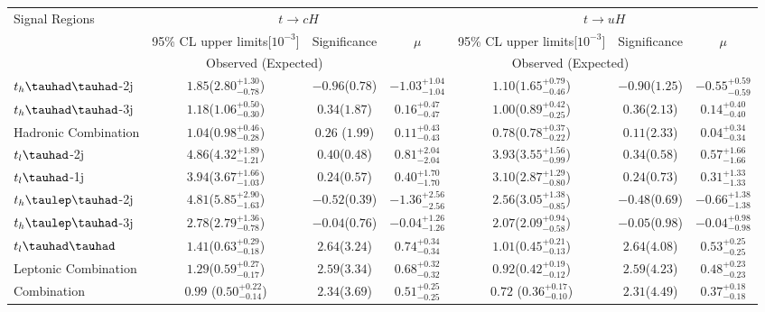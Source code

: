 \documentclass[PAPER, coverpage, atlasdraft=true, texlive=2016, UKenglish]{\ATLASLATEXPATH atlasdoc}
\providecommand{\DIFaddendFL}{} %
\begin{document}
\begin{table}[t!]
\begin{center}
{\begin{tabular}{lcccccc}
\multirow{3}{*}{Signal Regions} & \multicolumn{3}{c}{$t\to cH$}                                & \multicolumn{3}{c}{$t\to uH$}  \\
                                &  95\% CL upper limits[$10^{-3}$]  & Significance             &  $\mu$ &     95\% CL upper limits[$10^{-3}$]  & Significance   &  $\mu$  \\
                                &  \multicolumn{2}{c}{Observed (Expected)}                     &        &     \multicolumn{2}{c}{Observed (Expected)}& \\
\midrule
$t_h\thadhad$-2j                & $1.85$($2.80^{+1.30}_{-0.78}$)&$-0.96$($0.78$) & $-1.03^{+1.04}_{-1.04}$&$1.10$($1.65^{+0.79}_{-0.46}$)&$-0.90$($1.25$) &$-0.55^{+0.59}_{-0.59}$ \\
$t_h\thadhad$-3j                & $1.18$($1.06^{+0.50}_{-0.30}$)&$0.34$($1.87$)  & $0.16^{+0.47}_{-0.47}$ &$1.00$($0.89^{+0.42}_{-0.25}$)&$0.36$($2.13$)  &$0.14^{+0.40}_{-0.40}$  \\
Hadronic Combination            & $1.04$($0.98^{+0.46}_{-0.28}$)&$0.26$ ($1.99$) & $0.11^{+0.43}_{-0.43}$ &$0.78$($0.78^{+0.37}_{-0.22}$)&$0.11$($2.33$)  &$0.04^{+0.34}_{-0.34}$  \\
\midrule
$t_l\tauhad$-2j                 &$4.86$($4.32^{+1.89}_{-1.21}$) &$0.40$($0.48$)   &$0.81^{+2.04}_{-2.04}$  & $3.93$($3.55^{+1.56}_{-0.99}$) & $0.34$($0.58$)  &$0.57^{+1.66}_{-1.66}$\\
$t_l\tauhad$-1j                 &$3.94$($3.67^{+1.66}_{-1.03}$) &$0.24$($0.57$)   &$0.40^{+1.70}_{-1.70}$  & $3.10$($2.87^{+1.29}_{-0.80}$) & $0.24$($0.73$)  &$0.31^{+1.33}_{-1.33}$\\
$t_h\tlhad$-2j                  &$4.81$($5.85^{+2.90}_{-1.63}$) &$-0.52$($0.39$)  &$-1.36^{+2.56}_{-2.56}$ & $2.56$($3.05^{+1.38}_{-0.85}$) & $-0.48$($0.69$) &$-0.66^{+1.38}_{-1.38}$\\
$t_h\tlhad$-3j                  &$2.78$($2.79^{+1.36}_{-0.78}$) &$-0.04$($0.76$)  &$-0.04^{+1.26}_{-1.26}$ & $2.07$($2.09^{+0.94}_{-0.58}$) & $-0.05$($0.98$) &$-0.04^{+0.98}_{-0.98}$\\
$t_l\thadhad$                   &$1.41$($0.63^{+0.29}_{-0.18}$) &$2.64$($3.24$)   &$0.74^{+0.34}_{-0.34}$  & $1.01$($0.45^{+0.21}_{-0.13}$) & $2.64$($4.08$)  &$0.53^{+0.25}_{-0.25}$\\
Leptonic Combination            &$1.29$($0.59^{+0.27}_{-0.17}$) &$2.59$($3.34$)   &$0.68^{+0.32}_{-0.32}$  & $0.92$($0.42^{+0.19}_{-0.12}$) & $2.59$($4.23$)  &$0.48^{+0.23}_{-0.23}$\\
\midrule
Combination                     &$0.99$ ($0.50^{+0.22}_{-0.14}$)&$2.34$($3.69$)   &$0.51^{+0.25}_{-0.25}$ & $0.72$ ($0.36^{+0.17}_{-0.10}$)& $2.31$($4.49$)&$0.37^{+0.18}_{-0.18}$  \\
\bottomrule\bottomrule
\end{tabular}
}
\DIFaddendFL \label{tab:limits_summary}
\end{center}
\end{table}
\end{document}
